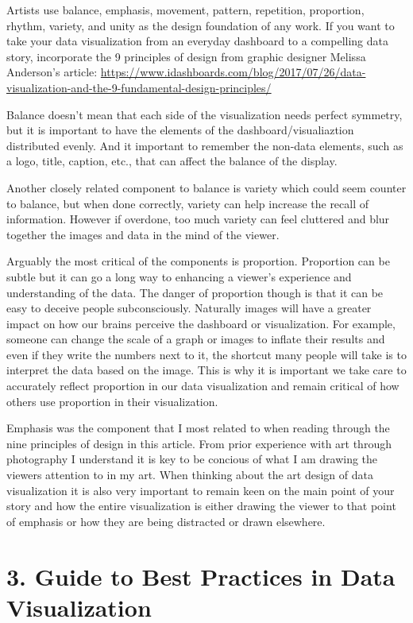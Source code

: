 \documentclass[]{book}
\theoremstyle{definition}
\theoremstyle{definition}
\theoremstyle{definition}
\theoremstyle{remark}
\begin{document}
Artists use balance, emphasis, movement, pattern, repetition,
proportion, rhythm, variety, and unity as the design foundation of any
work. If you want to take your data visualization from an everyday
dashboard to a compelling data story, incorporate the 9 principles of
design from graphic designer Melissa Anderson's article:
\url{https://www.idashboards.com/blog/2017/07/26/data-visualization-and-the-9-fundamental-design-principles/}

Balance doesn't mean that each side of the visualization needs perfect
symmetry, but it is important to have the elements of the
dashboard/visualiaztion distributed evenly. And it important to remember
the non-data elements, such as a logo, title, caption, etc., that can
affect the balance of the display.

Another closely related component to balance is variety which could seem
counter to balance, but when done correctly, variety can help increase
the recall of information. However if overdone, too much variety can
feel cluttered and blur together the images and data in the mind of the
viewer.

Arguably the most critical of the components is proportion. Proportion
can be subtle but it can go a long way to enhancing a viewer's
experience and understanding of the data. The danger of proportion
though is that it can be easy to deceive people subconsciously.
Naturally images will have a greater impact on how our brains perceive
the dashboard or visualization. For example, someone can change the
scale of a graph or images to inflate their results and even if they
write the numbers next to it, the shortcut many people will take is to
interpret the data based on the image. This is why it is important we
take care to accurately reflect proportion in our data visualization and
remain critical of how others use proportion in their visualization.

Emphasis was the component that I most related to when reading through
the nine principles of design in this article. From prior experience
with art through photography I understand it is key to be concious of
what I am drawing the viewers attention to in my art. When thinking
about the art design of data visualization it is also very important to
remain keen on the main point of your story and how the entire
visualization is either drawing the viewer to that point of emphasis or
how they are being distracted or drawn elsewhere.

\section{3. Guide to Best Practices in Data
Visualization}\label{guide-to-best-practices-in-data-visualization}
\end{document}

